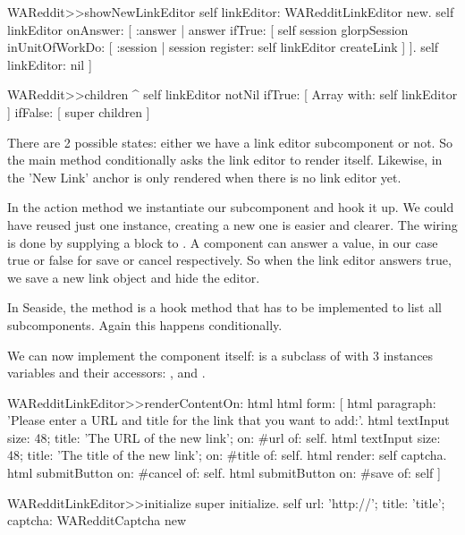 \documentclass[a4paper,10pt,twoside]{book}
\begin{document}
\begin{code}{}
WAReddit>>showNewLinkEditor
     self linkEditor: WARedditLinkEditor new. 
     self linkEditor onAnswer: [ :answer |
          answer ifTrue: [ 
               self session glorpSession inUnitOfWorkDo: [ :session |
                    session register: self linkEditor createLink ] ]. 
          self linkEditor: nil ]
\end{code}


\begin{code}{}
WAReddit>>children
    ^ self linkEditor notNil 
        ifTrue: [ Array with: self linkEditor ] 
        ifFalse: [ super children ]
\end{code}

There are 2 possible states: either we have a link editor subcomponent or not. So the main  method conditionally asks the link editor to render itself. Likewise, in  the 'New Link' anchor is only rendered when there is no link editor yet.

In the  action method we instantiate our subcomponent and hook it up. We could have reused just one instance, creating a new one is easier and clearer. The wiring is done by supplying a block to . A component can answer a value, in our case true or false for save or cancel respectively. So when the link editor answers true, we save a new link object and hide the editor.

In Seaside, the  method is a hook method that has to be implemented to list all subcomponents. Again this happens conditionally.

We can now implement the component itself:  is a subclass of  with 3 instances variables and their accessors: ,  and .



\begin{code}{}
WARedditLinkEditor>>renderContentOn: html
	html form: [
		html paragraph: 'Please enter a URL and title for the link that you want to add:'. 
		html textInput size: 48; title: 'The URL of the new link'; on: #url of: self. 
		html textInput size: 48; title: 'The title of the new link'; on: #title of: self. 
		html render: self captcha.
		html submitButton on: #cancel of: self. 
		html submitButton on: #save of: self ]
\end{code}


\begin{code}{}
WARedditLinkEditor>>initialize
	super initialize. 
	self url: 'http://'; 
		title: 'title'; 
		captcha: WARedditCaptcha new
\end{code}
\end{document}
